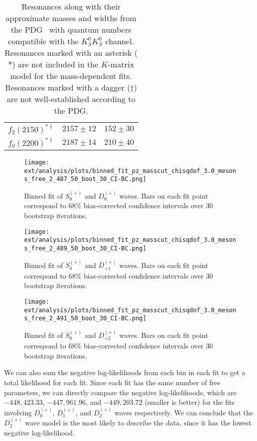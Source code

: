 \begin{table}
\begin{center}
\begin{tabular}{ccc}
      $f_2(2150)^{\ast\dagger}$ & $2157\pm 12$ & $152\pm 30$ \\
      $f_0(2200)^{\ast\dagger}$ & $2187\pm 14$ & $210\pm 40$ \\\bottomrule
    \end{tabular}
    \caption{Resonances along with their approximate masses and widths from the PDG~\cite{Zyla2020} with quantum numbers compatible with the $K_S^0K_S^0$ channel. Resonances marked with an asterisk ($\ast$) are not included in the $K$-matrix model for the mass-dependent fits. Resonances marked with a dagger ($\dagger$) are not well-established according to the PDG.}\label{tab:pdg-resonances}
  \end{center}
\end{table}


\begin{figure}
  \begin{center}
    \texttt{[image: ext/analysis/plots/binned\_fit\_pz\_masscut\_chisqdof\_3.0\_mesons\_free\_2\_487\_50\_boot\_30\_CI-BC.png]}
  \end{center}
  \caption{Binned fit of $S_{0}^{(+)}$ and $D_{0}^{(+)}$ waves. Bars on each fit point correspond to $68\%$ bias-corrected confidence intervals over $ 30 $ bootstrap iterations.}\label{fig:binned-fit-chisqdof-3.0-Sp-D0p}
\end{figure}
\begin{figure}
  \begin{center}
    \texttt{[image: ext/analysis/plots/binned\_fit\_pz\_masscut\_chisqdof\_3.0\_mesons\_free\_2\_489\_50\_boot\_30\_CI-BC.png]}
  \end{center}
  \caption{Binned fit of $S_{0}^{(+)}$ and $D_{+1}^{(+)}$ waves. Bars on each fit point correspond to $68\%$ bias-corrected confidence intervals over $ 30 $ bootstrap iterations.}\label{fig:binned-fit-chisqdof-3.0-Sp-D1p}
\end{figure}
\begin{figure}
  \begin{center}
    \texttt{[image: ext/analysis/plots/binned\_fit\_pz\_masscut\_chisqdof\_3.0\_mesons\_free\_2\_491\_50\_boot\_30\_CI-BC.png]}
  \end{center}
  \caption{Binned fit of $S_{0}^{(+)}$ and $D_{+2}^{(+)}$ waves. Bars on each fit point correspond to $68\%$ bias-corrected confidence intervals over $ 30 $ bootstrap iterations.}\label{fig:binned-fit-chisqdof-3.0-Sp-D2p}
\end{figure}

We can also sum the negative log-likelihoods from each bin in each fit to get a total likelihood for each fit. Since each fit has the same number of free parameters, we can directly compare the negative log-likelihoods, which are $-448,423.33$, $-447,961.96$, and $-449,203.72$ (smaller is better) for the fits involving $D_0^{(+)}$, $D_1^{(+)}$, and $D_2^{(+)}$ waves respectively. We can conclude that the $D_2^{(+)}$ wave model is the most likely to describe the data, since it has the lowest negative log-likelihood.

